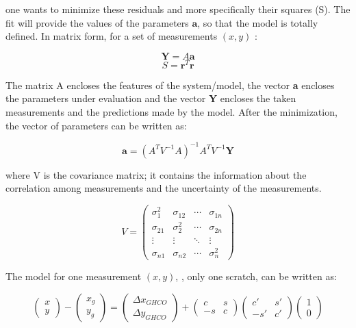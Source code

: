 \noindent one wants to minimize these residuals and more specifically their squares (S). The fit will provide the values of the parameters $\textbf{a}$, so that the model is totally defined. In matrix form, for a set of measurements $(x,y)$ :

\begin{equation}
\textbf{Y}= A \textbf{a}
\end{equation}
\begin{equation}
S=\textbf{r}^T\textbf{r}
\end{equation}

The matrix A encloses the features of the system/model, the vector \textbf{a} encloses the parameters under evaluation and the vector \textbf{Y} encloses the taken measurements and the predictions made by the model. After the minimization, the vector of parameters can be written as:

\begin{equation}\label{solution}
\textbf{a}=(A^TV^{-1}A)^{-1}A^TV^{-1}\textbf{Y}
\end{equation}

\noindent where V is the covariance matrix; it contains the information about the correlation among measurements and the uncertainty of the measurements.

\begin{equation}
  V=
  \begin{pmatrix}
    \sigma_1^2  & \sigma_{12}  & \cdots & \sigma_{1n} \\
    \sigma_{21} & \sigma_2^2   & \cdots & \sigma_{2n} \\
    \vdots      & \vdots       & \ddots & \vdots      \\
    \sigma_{n1} & \sigma_{n2}  & \cdots & \sigma_n^2
  \end{pmatrix}
\end{equation}

The model for one measurement $(x,y)$, \ie, only one scratch, can be written as:

\begin{equation}
\begin{pmatrix}
x\\ 
y
\end{pmatrix}-
\begin{pmatrix}
x_g\\ 
y_g
\end{pmatrix}=
\begin{pmatrix}
\Delta x_{GHCO}\\ 
\Delta y_{GHCO}
\end{pmatrix}
+
\begin{pmatrix}
c  & s\\ 
-s & c
\end{pmatrix}
\begin{pmatrix}
c' & s' \\ 
-s'& c' 
\end{pmatrix}
\begin{pmatrix}
1\\ 
0
\end{pmatrix}
\end{equation}


